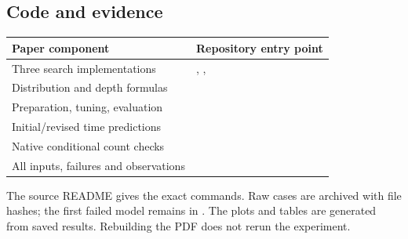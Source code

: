 \subsection{Code and evidence}
\begin{center}\small
\begin{tabularx}{\linewidth}{@{}lY@{}}\toprule
Paper component & Repository entry point\\\midrule
Three search implementations & , , \\
Distribution and depth formulas & \\
Preparation, tuning, evaluation & \\
Initial/revised time predictions & \\
Native conditional count checks & \\
All inputs, failures and observations & \\\bottomrule
\end{tabularx}\normalsize
\end{center}
The source README gives the exact commands. Raw cases are archived with file hashes; the
first failed model remains in . The plots and tables are generated
from saved results. Rebuilding the PDF does not rerun the experiment.
